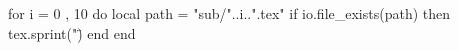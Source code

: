\documentclass[11pt, a4paper]{ltjsarticle}
\title{}
\author{}
\date{\today}
\begin{document}
\begin{luacode*}
    for i = 0 , 10 do
        local path = "sub/"..i..".tex"
        if io.file_exists(path) then
            tex.sprint("\")
        end
    end
\end{luacode*}
\end{document}

